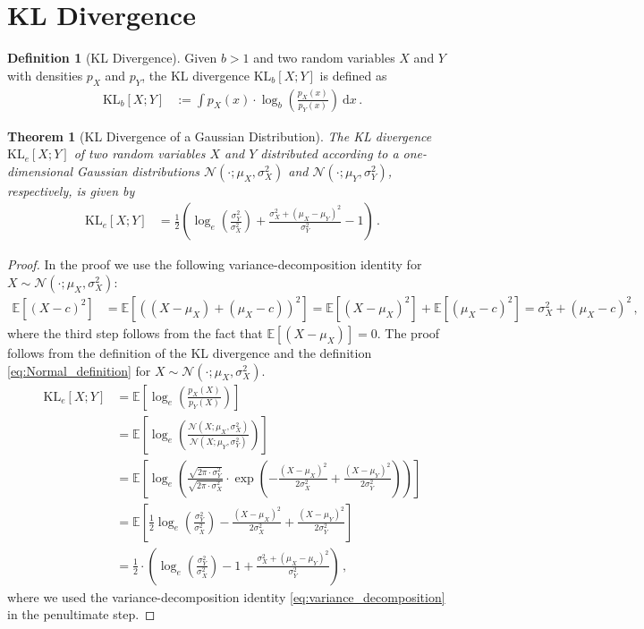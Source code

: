 \documentclass[a4paper]{article}
\newcommand{\Normal}[3]{{\mathcal N} \left({#1};{#2},{#3}\right)}
\newcommand{\expect}[1]{{\mathbb E \left[ {#1} \right]}}
\newcommand{\intd}[1]{\ \mathrm{d}{#1}}
\newcommand{\kl}[3]{{\mathrm{KL}_{#1}} \left[{#2};{#3}\right]}
\newtheorem{theorem}{Theorem}
\theoremstyle{definition}
\newtheorem{definition}{Definition}
\begin{document}
\section*{KL Divergence}

\begin{definition}[KL Divergence]
    Given $b > 1$ and two random variables $X$ and $Y$ with densities $p_X$ and $p_Y$, the KL divergence $\kl{b}{X}{Y}$ is defined as
    \begin{align}
        \kl{b}{X}{Y} & := \int p_X(x) \cdot \log_b \left(\frac{p_X(x)}{p_Y(x)}\right) \intd{x} \,.
    \end{align}
\end{definition}

\begin{theorem}[KL Divergence of a Gaussian Distribution]
    The KL divergence $\kl{e}{X}{Y}$ of two random variables $X$ and $Y$ distributed according to a one-dimensional Gaussian distributions $\Normal{\cdot}{\mu_X}{\sigma_X^2}$ and $\Normal{\cdot}{\mu_Y}{\sigma_Y^2}$, respectively, is given by
    \begin{align}
        \kl{e}{X}{Y} & = \frac{1}{2}\left(\log_e\left(\frac{\sigma_Y^2}{\sigma_X^2}\right) + \frac{\sigma_X^2 + (\mu_X - \mu_Y)^2}{\sigma_Y^2} - 1\right) \,.
    \end{align}
\end{theorem}

\begin{proof}
    In the proof we use the following variance-decomposition identity for $X \sim \Normal{\cdot}{\mu_X}{\sigma_X^2}$:
    \begin{align}
        \expect{(X - c)^2} & =  \expect{((X - \mu_X) + (\mu_X - c))^2} = \expect{(X - \mu_X)^2} + \expect{(\mu_X - c)^2} = \sigma_X^2 + (\mu_X - c)^2\,, \label{eq:variance_decomposition}
    \end{align}
    where the third step follows from the fact that $\expect{(X - \mu_X)} = 0$. The proof follows from the definition of the KL divergence and the definition \eqref{eq:Normal_definition} for $X \sim \Normal{\cdot}{\mu_X}{\sigma_X^2}$.
    \begin{align*}
        \kl{e}{X}{Y} & = \expect{\log_e\left(\frac{p_X(X)}{p_Y(X)}\right)} \\
                     & = \expect{\log_e\left(\frac{\Normal{X}{\mu_X}{\sigma_X^2}}{\Normal{X}{\mu_Y}{\sigma_Y^2}}\right)} \\
                     & = \expect{\log_e\left(\frac{\sqrt{2\pi\cdot \sigma_Y^2}}{\sqrt{2\pi\cdot \sigma_X^2}} \cdot \exp\left(-\frac{(X-\mu_X)^2}{2\sigma_X^2} + \frac{(X-\mu_Y)^2}{2\sigma_Y^2}\right) \right)} \\
                     & = \expect{\frac{1}{2}\log_e\left(\frac{\sigma_Y^2}{\sigma_X^2}\right) - \frac{(X-\mu_X)^2}{2\sigma_X^2} + \frac{(X-\mu_Y)^2}{2\sigma_Y^2}} \\
                     & = \frac{1}{2} \cdot \left(\log_e\left(\frac{\sigma_Y^2}{\sigma_X^2}\right) - 1 + \frac{\sigma_X^2 + \left( \mu_X - \mu_Y \right)^2}{\sigma_Y^2}\right) \,,
    \end{align*}
    where we used the variance-decomposition identity \eqref{eq:variance_decomposition} in the penultimate step.
\end{proof}
\end{document}
